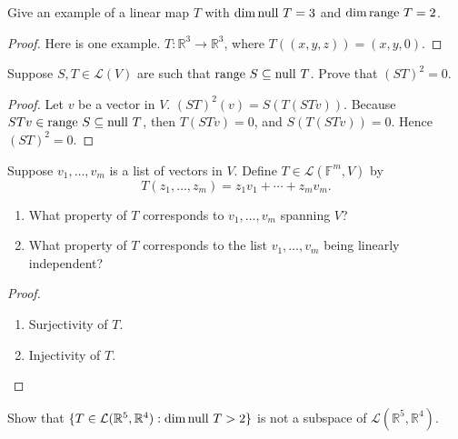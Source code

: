 \begin{exercise}
    Give an example of a linear map $T$ with $\dim \operatorname{null}\,{T} = 3$ and $\dim \operatorname{range}\,{T} = 2$.
\end{exercise}

\begin{proof}
    Here is one example. $T: \mathbb{R}^{3}\to \mathbb{R}^{3}$, where $T((x, y, z)) = (x, y, 0)$.
\end{proof}
\newpage

\begin{exercise}
    Suppose $S, T\in \mathcal{L}(V)$ are such that $\operatorname{range}\,{S}\subseteq \operatorname{null}\,{T}$. Prove that ${(ST)}^{2} = 0$.
\end{exercise}

\begin{proof}
    Let $v$ be a vector in $V$. ${(ST)}^{2}(v) = S(T(STv))$. Because $STv\in\operatorname{range}\,{S}\subseteq \operatorname{null}\,{T}$, then $T(STv) = 0$, and $S(T(STv)) = 0$. Hence ${(ST)}^{2} = 0$.
\end{proof}
\newpage

\begin{exercise}
    Suppose $v_{1}, \ldots, v_{m}$ is a list of vectors in $V$. Define $T\in \mathcal{L}(\mathbb{F}^{m}, V)$ by
    \[ T(z_{1}, \ldots, z_{m}) = z_{1}v_{1} + \cdots + z_{m}v_{m}. \]

    \begin{enumerate}[label={(\alph*)}]
        \item What property of $T$ corresponds to $v_{1}, \ldots, v_{m}$ spanning $V$?
        \item What property of $T$ corresponds to the list $v_{1}, \ldots, v_{m}$ being linearly independent?
    \end{enumerate}
\end{exercise}

\begin{proof}
    \begin{enumerate}[label={(\alph*)}]
        \item Surjectivity of $T$.
        \item Injectivity of $T$.
    \end{enumerate}
\end{proof}
\newpage

\begin{exercise}
    Show that $\{T \in \mathcal{L}(\mathbb{R}^{5}, \mathbb{R}^{4} ): \dim \operatorname{null}\,{T} > 2\}$ is not a subspace of $\mathcal{L}(\mathbb{R}^{5}, \mathbb{R}^{4})$.
\end{exercise}

